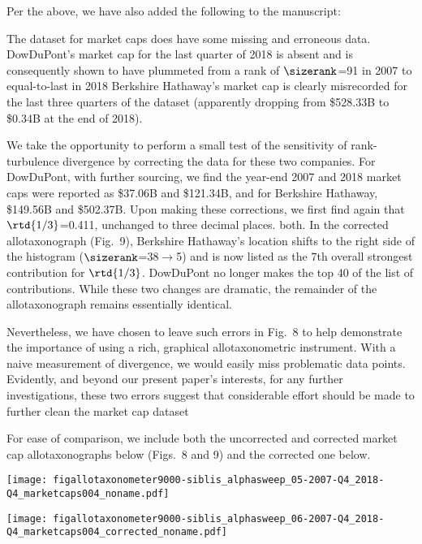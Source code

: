 Per the above, we have also added the following to the manuscript:

\begin{excerpt}
  The dataset for market caps does
  have some missing and erroneous data.
  DowDuPont's market cap for the last quarter of 2018 is absent
  and is consequently shown to have plummeted from
  a rank of
  $\sizerank$=91 in 2007
  to equal-to-last in 2018
  Berkshire Hathaway's
  market cap is clearly misrecorded
  for the last three
  quarters of the dataset
  (apparently dropping from
  \$528.33B
  to
  \$0.34B at the end of 2018).

  We take the opportunity to perform a small test of the sensitivity of rank-turbulence divergence
  by correcting the data for these two companies.
  For DowDuPont, with further sourcing, we find
  the year-end 2007 and 2018 market caps were reported as
  \$37.06B
  and
  \$121.34B,
  and for
  Berkshire Hathaway,
  \$149.56B
  and
  \$502.37B.
  Upon making these corrections, we first find again
  that $\rtd{1/3}$=0.411, unchanged to three decimal places.
  both.
  In the corrected allotaxonograph (Fig.~9),
  Berkshire Hathaway's location shifts to the right
  side of the histogram ($\sizerank$=38$\rightarrow$5)
  and is now listed as the 7th overall strongest contribution
  for $\rtd{1/3}$.
  DowDuPont no longer makes the top 40 of
  the list of contributions.
  While these two changes are dramatic,
  the remainder of the allotaxonograph
  remains essentially identical.

  Nevertheless, we have chosen to leave such errors in
  Fig.~8
  to help demonstrate the importance of using a rich,
  graphical allotaxonometric instrument.
  With a naive measurement of divergence, we would easily miss problematic data points.
  Evidently, and beyond our present paper's interests,
  for any further investigations,
  these two errors suggest that considerable effort should
  be made to further clean the market cap dataset
\end{excerpt}

\clearpage

For ease of comparison, we include both the
uncorrected and corrected market cap allotaxonographs below (Figs.~8 and 9)
and the corrected one below.

\texttt{[image: figallotaxonometer9000-siblis\_alphasweep\_05-2007-Q4\_2018-Q4\_marketcaps004\_noname.pdf]}

\texttt{[image: figallotaxonometer9000-siblis\_alphasweep\_06-2007-Q4\_2018-Q4\_marketcaps004\_corrected\_noname.pdf]}

